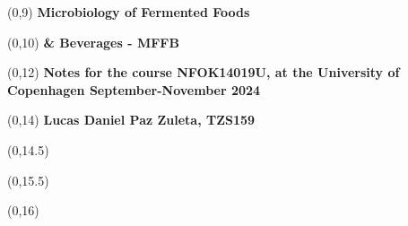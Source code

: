 \begin{titlepage}


\begin{textblock}{9.4}(0,9)
    \Huge{\sffamily\bfseries{Microbiology of Fermented Foods}}
\end{textblock}
\begin{textblock}{9.4}(0,10)
    \Huge{\sffamily\bfseries{\& Beverages - MFFB}}
\end{textblock}

\begin{textblock}{9.4}(0,12)
    \LARGE{\sffamily\bfseries{Notes for the course NFOK14019U, at the University of Copenhagen September-November 2024}}
\end{textblock}

\begin{textblock}{9.4}(0,14)
    \large{\sffamily\bfseries{Lucas Daniel Paz Zuleta, TZS159}}
\end{textblock}

\begin{textblock}{9.4}(0,14.5)
    \large{}
\end{textblock}

\begin{textblock}{9.4}(0,15.5)
    \large{}
\end{textblock}

\begin{textblock}{8.4}(0,16)
    \large{}
\end{textblock}


\end{titlepage}
